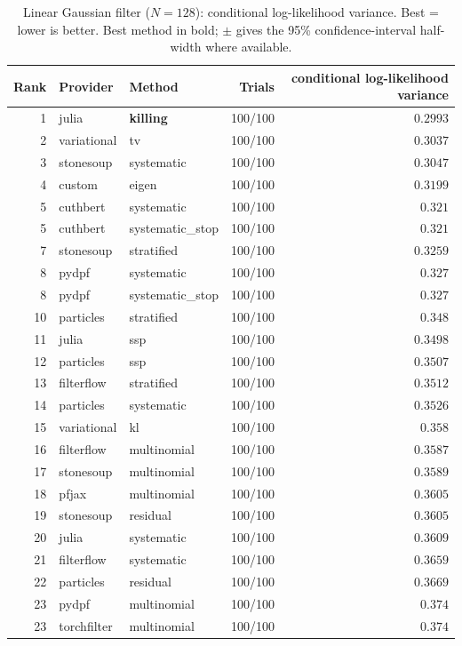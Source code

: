 \begin{table}[!htbp]
\centering
\small
\caption{Linear Gaussian filter ($N=128$): conditional log-likelihood variance. Best = lower is better. Best method in bold; $\pm$ gives the 95\% confidence-interval half-width where available.}
\label{tab:linear-gaussian-filter-conditional-loglik-variance}
\begin{tabular}{rllrr}
\toprule
Rank & Provider & Method & Trials & conditional log-likelihood variance \\
\midrule
1 & julia & \textbf{killing} & 100/100 & $\mathbf{0.2993}$ \\
2 & variational & tv & 100/100 & $0.3037$ \\
3 & stonesoup & systematic & 100/100 & $0.3047$ \\
4 & custom & eigen & 100/100 & $0.3199$ \\
5 & cuthbert & systematic & 100/100 & $0.321$ \\
5 & cuthbert & systematic\_stop & 100/100 & $0.321$ \\
7 & stonesoup & stratified & 100/100 & $0.3259$ \\
8 & pydpf & systematic & 100/100 & $0.327$ \\
8 & pydpf & systematic\_stop & 100/100 & $0.327$ \\
10 & particles & stratified & 100/100 & $0.348$ \\
11 & julia & ssp & 100/100 & $0.3498$ \\
12 & particles & ssp & 100/100 & $0.3507$ \\
13 & filterflow & stratified & 100/100 & $0.3512$ \\
14 & particles & systematic & 100/100 & $0.3526$ \\
15 & variational & kl & 100/100 & $0.358$ \\
16 & filterflow & multinomial & 100/100 & $0.3587$ \\
17 & stonesoup & multinomial & 100/100 & $0.3589$ \\
18 & pfjax & multinomial & 100/100 & $0.3605$ \\
19 & stonesoup & residual & 100/100 & $0.3605$ \\
20 & julia & systematic & 100/100 & $0.3609$ \\
21 & filterflow & systematic & 100/100 & $0.3659$ \\
22 & particles & residual & 100/100 & $0.3669$ \\
23 & pydpf & multinomial & 100/100 & $0.374$ \\
23 & torchfilter & multinomial & 100/100 & $0.374$ \\

\end{tabular}
\end{table}
